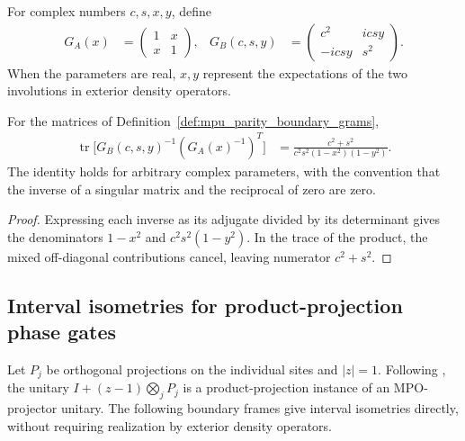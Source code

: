 \begin{definition}
    \label{def:mpu_parity_boundary_grams}
    \leanok
    For complex numbers $c,s,x,y$, define
    \begin{align}
        G_A(x)     & =\begin{pmatrix}1&x\\x&1\end{pmatrix},            &
        G_B(c,s,y) & =\begin{pmatrix}c^2&icsy\\-icsy&s^2\end{pmatrix}.
    \end{align}
    When the parameters are real, $x,y$ represent the expectations of
    the two involutions in exterior density operators.
\end{definition}

\begin{lemma}
    \label{thm:mpu_parity_inverse_trace}
    \leanok
    For the matrices of Definition~\ref{def:mpu_parity_boundary_grams},
    \begin{align}
        \operatorname{tr}\bigl[G_B(c,s,y)^{-1}(G_A(x)^{-1})^T\bigr]
         & =\frac{c^2+s^2}{c^2s^2(1-x^2)(1-y^2)}.
    \end{align}
    The identity holds for arbitrary complex parameters, with the convention
    that the inverse of a singular matrix and the reciprocal of zero are zero.
\end{lemma}

\begin{proof}\leanok
    Expressing each inverse as its adjugate divided by its determinant
    gives the denominators $1-x^2$ and $c^2s^2(1-y^2)$. In the trace of
    the product, the mixed off-diagonal contributions cancel, leaving
    numerator $c^2+s^2$.
\end{proof}

\subsection{Interval isometries for product-projection phase gates}

Let $P_j$ be orthogonal projections on the individual sites and $|z|=1$.
Following \cite{Styliaris2025MPUCircuits}, the unitary
$I+(z-1)\bigotimes_jP_j$ is a product-projection instance of an
MPO-projector unitary. The following boundary frames give interval
isometries directly, without requiring realization by exterior density
operators.

